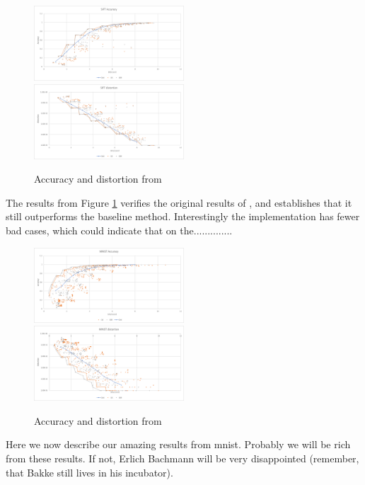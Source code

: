 \begin{figure}[h]
\includegraphics[width=0.5\textwidth]{figures/graphs/sift_accuracy}
\includegraphics[width=0.5\textwidth]{figures/graphs/sift_distortion}
\caption{Accuracy and distortion from \sift{}}
\label{fig:graph sift}
\end{figure}
\clearpage{}
The results from Figure \ref{fig:graph sift} verifies the original results of \qs{}, and establishes that it still outperforms the baseline method. Interestingly the \qsr{} implementation has fewer bad cases, which could indicate that on the..............

\begin{figure}[h]
\includegraphics[width=0.5\textwidth]{figures/graphs/mnist_accuracy}
\includegraphics[width=0.5\textwidth]{figures/graphs/mnist_distortion}
\caption{Accuracy and distortion from \mnist{}}
\label{fig:graph mnist}
\end{figure}
Here we now describe our amazing results from mnist. Probably we will be rich from these results. If not, Erlich Bachmann will be very disappointed (remember, that Bakke still lives in his incubator). 

